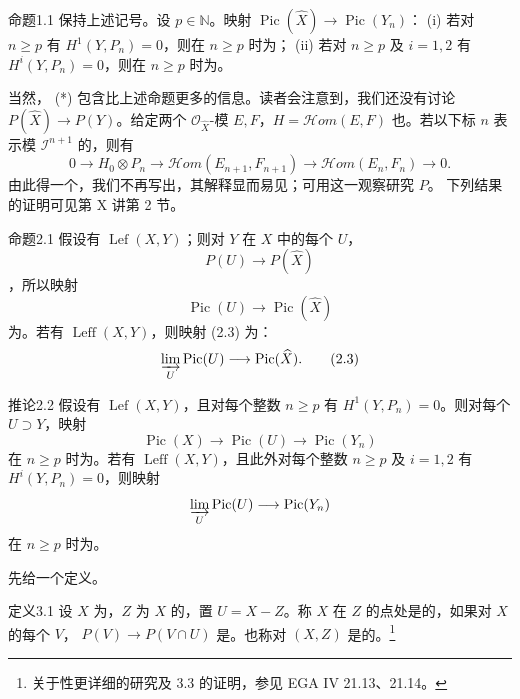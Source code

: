 \begin{SGAresult}{命题}{1.1}
保持上述记号。设 $p\in\mathbb N$。映射 $\operatorname{Pic}(\widehat X)\to\operatorname{Pic}(Y_n)$：
(i) 若对 $n\geq p$ 有 $H^1(Y,P_n)=0$，则在 $n\geq p$ 时为；
(ii) 若对 $n\geq p$ 及 $i=1,2$ 有 $H^i(Y,P_n)=0$，则在 $n\geq p$ 时为。
\end{SGAresult}
当然， (*) 包含比上述命题更多的信息。读者会注意到，我们还没有讨论 $P(\widehat X)\to P(Y)$。给定两个 $\mathcal O_{\widehat X}$-模 $E,F$，$H=\mathcal Hom(E,F)$ 也。若以下标 $n$ 表示模 $\mathcal I^{n+1}$ 的，则有
\[0\longrightarrow H_0\otimes P_n\longrightarrow\mathcal Hom(E_{n+1},F_{n+1})\longrightarrow\mathcal Hom(E_n,F_n)\longrightarrow0.\]
由此得一个，我们不再写出，其解释显而易见；可用这一观察研究 $P$。
下列结果的证明可见第 X 讲第 2 节。
\begin{SGAresult}{命题}{2.1}
假设有 $\operatorname{Lef}(X,Y)$；则对 $Y$ 在 $X$ 中的每个 $U$，
\[P(U)\longrightarrow P(\widehat X)\tag{2.1}\]
，所以映射
\[\operatorname{Pic}(U)\longrightarrow\operatorname{Pic}(\widehat X)\tag{2.2}\]
为。若有 $\operatorname{Leff}(X,Y)$，则映射 (2.3) 为：
\[\varinjlim_U\operatorname{Pic}(U)\longrightarrow\operatorname{Pic}(\widehat X).\tag{2.3}\]
\end{SGAresult}
\begin{SGAresult}{推论}{2.2}
假设有 $\operatorname{Lef}(X,Y)$，且对每个整数 $n\geq p$ 有 $H^1(Y,P_n)=0$。则对每个 $U\supset Y$，映射
\[\operatorname{Pic}(X)\longrightarrow\operatorname{Pic}(U)\longrightarrow\operatorname{Pic}(Y_n)\]
在 $n\geq p$ 时为。若有 $\operatorname{Leff}(X,Y)$，且此外对每个整数 $n\geq p$ 及 $i=1,2$ 有 $H^i(Y,P_n)=0$，则映射
\[\varinjlim_U\operatorname{Pic}(U)\longrightarrow\operatorname{Pic}(Y_n)\]
在 $n\geq p$ 时为。
\end{SGAresult}
先给一个定义。
\begin{SGAresult}{定义}{3.1}
设 $X$ 为，$Z$ 为 $X$ 的，置 $U=X-Z$。称 $X$ 在 $Z$ 的点处是的，如果对 $X$ 的每个 $V$， $P(V)\to P(V\cap U)$ 是。也称对 $(X,Z)$ 是的。\footnote{关于性更详细的研究及 3.3 的证明，参见 EGA IV 21.13、21.14。}
\end{SGAresult}

